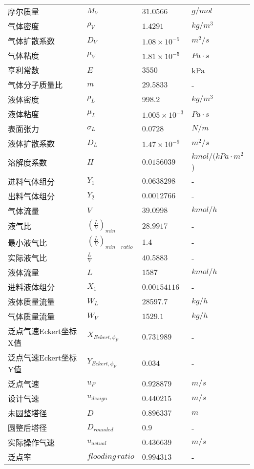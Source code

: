 \begin{longtable}{
		@{} p{} p{} 
		p{} p{} @{}
		}
	摩尔质量 & $M_V$ & $31.0566$ & $g/mol$ \\
	气体密度 & $\rho_V$ & $1.4291$ & $kg/m^{3}$ \\
	气体扩散系数 & $D_V$ & $1.08 \times 10^{-5}$ & $m^{2}/s$ \\
	气体粘度 & $\mu_V$ & $1.81 \times 10^{-5}$ & $Pa·s$ \\
	亨利常数 & $E$ & $3550$ & kPa \\
	气体分子质量比 & $m$ & $29.5833$ & - \\
	液体密度 & $\rho_L$ & $998.2$ & $kg/m^{3}$ \\
	液体粘度 & $\mu_L$ & $1.005 \times 10^{-3}$ & $Pa·s$ \\
	表面张力 & $\sigma_L$ & $0.0728$ & $N/m$ \\
	液体扩散系数 & $D_L$ & $1.47 \times 10^{-9}$ & $m^{2}/s$ \\
	溶解度系数 & $H$ & $0.0156039$ & $kmol/(kPa·m^{2}$) \\
	进料气体组分 & $Y_1$ & $0.0638298$ & - \\
	出料气体组分 & $Y_2$ & $0.0012766$ & - \\
	气体流量 & $V$ & $39.0998$ & $kmol/h$ \\
	液气比 & $\left(\frac{L}{V}\right)_{min}$ & $28.9917$ & - \\
	最小液气比 & $\left(\frac{L}{V}\right)_{min \quad ratio}$ & $1.4$ & - \\
	实际液气比 & $\frac{L}{V}$ & $40.5883$ & - \\
	液体流量 & $L$ & $1587$ & $kmol/h$ \\
	进料液体组分 & $X_1$ & $0.00154116$ & - \\
	液体质量流量 & $W_L$ & $28597.7$ & $kg/h$ \\
	气体质量流量 & $W_V$ & $1529.1$ & $kg/h$ \\
	泛点气速Eckert坐标X值 & $X_{Eckert, \phi_F}$ & $0.731989$ & - \\
	泛点气速Eckert坐标Y值 & $Y_{Eckert, \phi_F}$ & $0.034$ & - \\
	泛点气速 & $u_F$ & $0.9 28879$ & $m/s$ \\
	设计气速 & $u_{design}$ & $0.440215$ & $m/s$ \\
	未圆整塔径 & $D$ & $0.896337$ & $m$ \\
	圆整后塔径 & $D_{rounded}$ & $0.9$ & - \\
	实际操作气速 & $u_{actual}$ & $0.436639$ & $m/s$ \\
	泛点率 & $flooding \, ratio$ & $0.9 94313$ & - \\

\end{longtable}
